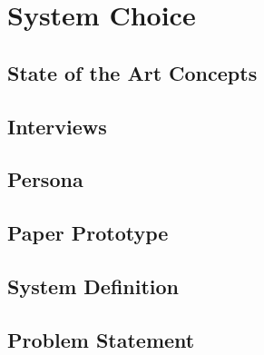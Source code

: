 \chapter{System Choice}


\section{State of the Art Concepts}
\label{StateOfTheArt}


\section{Interviews}





\section{Persona}


\section{Paper Prototype}

\section{System Definition}


\section{Problem Statement}
\label{ProblemStatement}

